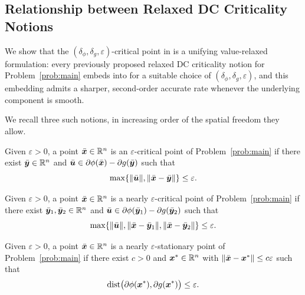 
\subsection{Relationship between Relaxed DC Criticality Notions}
\label{sec:relationship-relaxed-dc-criticality}

We show that the $(\delta_\phi,\delta_g,\varepsilon)$-critical point in
 is a unifying value-relaxed formulation:
every previously proposed relaxed DC criticality notion for
Problem~\eqref{prob:main} embeds into
 for a suitable choice of
$(\delta_\phi,\delta_g,\varepsilon)$, and this embedding admits a sharper,
second-order accurate rate whenever the underlying component is smooth.

We recall three such notions, in increasing order of the spatial freedom
they allow.

\begin{definition}
\label{Def: epsilon-critical point in DC}
Given $\varepsilon>0$, a point $\bar{\bm{x}}\in\mathbb{R}^n$ is an $\varepsilon$-critical
point of Problem~\eqref{prob:main} if there exist
$\bar{\bm{y}}\in\mathbb{R}^n$ and $\bar{\bm{u}}\in\partial\phi(\bar{\bm{x}})-\partial g(\bar{\bm{y}})$
such that
\[
    \max\limits\{\|\bar{\bm{u}}\|,\|\bar{\bm{x}}-\bar{\bm{y}}\|\}\le\varepsilon .
\]
\end{definition}

\begin{definition}
\label{Def: epsilon-critical point 3}
Given $\varepsilon>0$, a point $\bar{\bm{x}}\in\mathbb{R}^n$ is a nearly
$\varepsilon$-critical point of Problem~\eqref{prob:main}
if there exist $\bar{\bm{y}}_1,\bar{\bm{y}}_2\in\mathbb{R}^n$ and
$\bar{\bm{u}}\in\partial\phi(\bar{\bm{y}}_1)-\partial g(\bar{\bm{y}}_2)$ such that
\[
    \max\limits\{\|\bar{\bm{u}}\|,\|\bar{\bm{x}}-\bar{\bm{y}}_1\|,\|\bar{\bm{x}}-\bar{\bm{y}}_2\|\}
    \le\varepsilon .
\]
\end{definition}

\begin{definition}
\label{def:xu-near-stationary}
Given $\varepsilon>0$, a point $\bar{\bm{x}}\in\mathbb{R}^n$ is a nearly
$\varepsilon$-stationary point of Problem~\eqref{prob:main} if there exist
$c>0$ and $\bm{x}^*\in\mathbb{R}^n$ with
$\|\bar{\bm{x}}-\bm{x}^*\|\le c\varepsilon$ such that
\[
    \operatorname{dist}\bigl(\partial\phi(\bm{x}^*),\partial g(\bm{x}^*)\bigr)
    \le\varepsilon .
\]
\end{definition}

